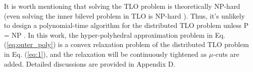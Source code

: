 \documentclass[letterpaper]{article} %
\begin{document}
It is worth mentioning that solving the TLO problem is theoretically NP-hard (even solving the inner bilevel problem in TLO is NP-hard \cite{ben1990computational}). Thus, it’s unlikely to design a polynomial-time algorithm for the distributed TLO problem unless P = NP \cite{arora2009computational}.  In this work, the hyper-polyhedral
approximation problem in Eq. (\ref{eq:outer_poly}) is a convex relaxation problem of the distributed TLO problem in Eq. (\ref{eq:1}), and the relaxation will be continuously tightened as $\mu$-cuts are added. Detailed discussions are provided in Appendix D.

\end{document}
